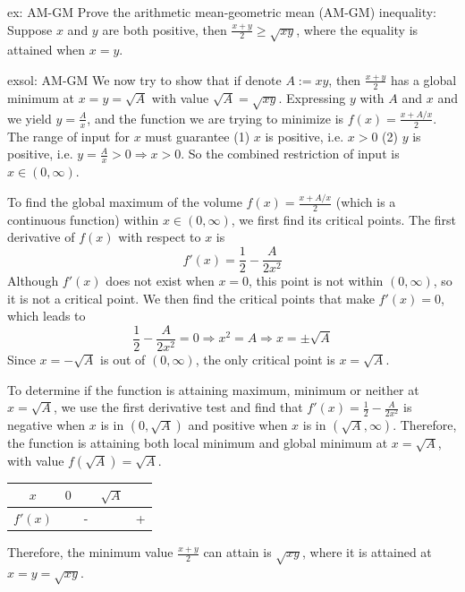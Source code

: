 \begin{ex}[]{ex: AM-GM}
    Prove the arithmetic mean-geometric mean (AM-GM) inequality: Suppose $x$ and $y$ are both positive, then $\frac{x+y}{2} \ge \sqrt{xy}$, where the equality is attained when $x = y$.
\end{ex}

\begin{exsol}[]{exsol: AM-GM}
    We now try to show that if denote $A := xy$, then $\frac{x+y}{2}$ has a global minimum at $x = y = \sqrt{A}$ with value $\sqrt{A} = \sqrt{xy}$.  Expressing $y$ with $A$ and $x$ and we yield $y = \frac{A}{x}$, and the function we are trying to minimize is $f(x) = \frac{x+A/x}{2}$.  The range of input for $x$ must guarantee (1) $x$ is positive, i.e. $x > 0$ (2) $y$ is positive, i.e. $y = \frac{A}{x} > 0 \Rightarrow x > 0$.  So the combined restriction of input is $x \in (0, \infty)$.
    
    To find the global maximum of the volume $f(x) = \frac{x+A/x}{2}$ (which is a continuous function) within $x \in (0, \infty)$, we first find its critical points.  The first derivative of $f(x)$ with respect to $x$ is 
    \[f'(x) = \frac{1}{2} - \frac{A}{2x^2}\]
    Although $f'(x)$ does not exist when $x=0$, this point is not within $(0, \infty)$, so it is not a critical point.  We then find the critical points that make $f'(x) = 0$, which leads to
    \[\frac{1}{2} - \frac{A}{2x^2} = 0 \Rightarrow x^2 = A \Rightarrow x = \pm \sqrt{A}\]
    Since $x = -\sqrt{A}$ is out of $(0, \infty)$, the only critical point is $x = \sqrt{A}$.
    
    To determine if the function is attaining maximum, minimum or neither at $x = \sqrt{A}$, we use the first derivative test and find that $f'(x) = \frac{1}{2} - \frac{A}{2x^2}$ is negative when $x$ is in $(0, \sqrt{A})$ and positive when $x$ is in $(\sqrt{A}, \infty)$.  Therefore, the function is attaining both local minimum and global minimum at $x = \sqrt{A}$, with value $f(\sqrt{A}) = \sqrt{A}$.
    
    \begin{center}
        \begin{tabular}{ccccc}
            $x$    & $0$ &   & $\sqrt{A}$ &     \\
            \hline
            $f'(x)$ &     & - &      & +
        \end{tabular}
    \end{center}
    
    Therefore, the minimum value $\frac{x+y}{2}$ can attain is $\sqrt{xy}$, where it is attained at $x = y = \sqrt{xy}$.
\end{exsol}
